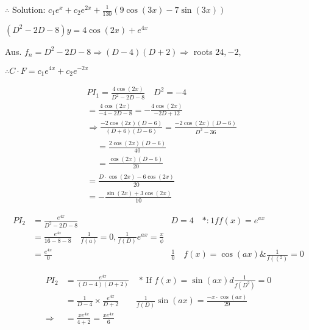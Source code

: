 \documentclass[12pt, a4paper]{article}
\begin{document}
	$\therefore$ Solution: $c_{1} e^{x}+c_{2} e^{2 x}+\frac{1}{130}(9 \cos(3 x)-7 \sin(3 x))$

	$\left(D^{2}-2 D-8\right) y=4 \cos(2 x)+e^{4 x}$

	Aus. $f_{n}=D^{2}-2 D-8 \Rightarrow(D-4)(D+2) \Rightarrow$ roots $24,-2$,

	$\therefore C \cdot F=c_{1} e^{4 x}+c_{2} e^{-2 x}$

$$
\begin{aligned}
	 & P I_{1}=\frac{4 \cos(2 x)}{D^{2}-2 D-8} \quad D^{2}=-4                              \\
	 & =\frac{4 \cos(2 x)}{-4-2 D-8}=-\frac{4 \cos(2 x)}{-2 D+12}                          \\
	 & \Rightarrow \frac{-2 \cos(2 x)(D-6)}{(D+6)(D-6)}=\frac{-2 \cos(2 x)(D-6)}{D^{2}-36} \\
	 & \begin{aligned}
		    & =\frac{2 \cos(2 x)(D-6)}{40} \\
		    & =\frac{\cos(2 x)(D-6)}{20}
	   \end{aligned}                                                     \\
	 & =\frac{D \cdot \cos(2 x)-6 \cos(2 x)}{20}                                           \\
	 & =-\frac{\sin(2 x)+3 \cos(2 x)}{10}
\end{aligned}
$$

$$
\begin{array}{rlrl}
	P I_{2} & =\frac{e^{4 x}}{D^{2}-2 D-8}                                                          & D=4 \quad *: 1 f f(x)=e^{a x}                                                   \\
	        & =\frac{e^{4 x}}{16-8-8} \quad \frac{1}{f(a)}=0, \frac{1}{f(D)} e^{a x}=\frac{x}{\phi}                                                                                   \\
	        & =\frac{e^{4 x}}{0}                                                                    & \frac{1}{0} \quad f(x)=\cos(a x) \& \frac{1}{f\left(\left(^{2}\right)\right.}=0
\end{array}
$$

$$
\begin{array}{rlrl}
	P I_{2}     & =\frac{e^{4 x}}{(D-4)(D+2)}                & \text{ * If } f(x)=\sin(a x) d \frac{1}{f\left(D^{2}\right)}=0 \\
	            & =\frac{1}{D-4} \times \frac{e^{4 x}}{D+2}  & \frac{1}{f(D)} \sin(a x)=\frac{-x \cdot \cos(a x)}{29}         \\
	\Rightarrow & =\frac{x e^{4 x}}{4+2}=\frac{x e^{4 x}}{6}
\end{array}
$$
\end{document}
